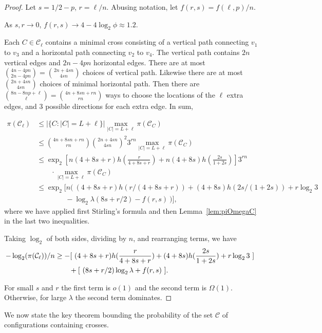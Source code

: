 \documentclass[letterpaper,english,numberwithinsect]{amsart}
\newcommand{\cC}{\mathcal{C}}
\begin{document}
\begin{proof}
Let $s = 1/2 - p$, $r = \ell/n$. Abusing notation, let $f(r, s) = f(\ell, p)/n$.

As $s, r \rightarrow 0$, $f(r, s) \rightarrow 4 - 4\log_2\phi \approx 1.2$.

Each $C \in \cC_{\ell}$ contains a minimal cross consisting of a vertical path connecting $v_1$ to $v_3$ and a horizontal path connecting $v_2$ to $v_4$. 
The vertical path contains $2n$ vertical edges and $2n-4pn$ horizontal edges. 
There are at most $\binom{4n-4pn}{2n-4pn} = \binom{2n+4sn}{4sn}$ choices of  vertical path.  
Likewise there are at most $\binom{2n+4sn}{4sn}$ choices of minimal horizontal path.  
Then there are $\binom{8n-8np+\ell}{\ell} = \binom{4n+8sn+rn}{rn}$ ways to choose the locations of the $\ell$ extra edges, and $3$ possible directions for each extra edge. In sum,

\begin{align*}
\pi(\cC_{\ell}) & \leq | \{C : |C| = L + \ell \}| \max_{|C| = L + \ell} \pi(\cC_C ) \\
      & \leq \binom{4n+8sn+rn}{rn} \binom{2n+4sn}{4sn}^2 3^{rn} 
      \max_{|C| = L + \ell} \pi(\cC_C ) \\
      & \leq \exp_2\left[n(4+8s+r)h\left(\frac{r}{4+8s+r}\right) + n(4+8s)h\left(\frac{2s}{1 + 2s}\right)\right] 3^{rn} \\
      &  \qquad \cdot \max_{|C| = L + \ell} \pi(\cC_C ) \\
      & \leq \exp_2[n(~ (4+8s+r)h(r/(4+8s+r)) + (4+8s)h(2s/(1 + 2s)) + r\log_2 3  \\
      & \qquad\qquad  - \log_2\lambda(8s + r/2) - f(r, s)~)] ,
\end{align*}
where we have applied first Stirling's formula and then Lemma~\ref{lem:piOmegaC} in the last two inequalities.

Taking $\log_2$ of both sides, dividing by $n$, and rearranging terms, we have
\begin{align*}
- \log_2(\pi(\cC_{\ell}))/n & \geq  
                -[~(4+8s+r)h(\frac{r}{4+8s+r}) + (4+8s)h(\frac{2s}{1+2s}) + r \log_2 3 ~] \cr
				     & \qquad + [~ (8s+ r/2) \log_2 \lambda + f(r, s) ~] .
\end{align*}

For small $s$ and $r$ the first term is $o(1)$ and the second term is $\Omega(1)$. Otherwise, for large $\lambda$ the second term dominates.
\end{proof}

We now state the key theorem bounding  the probability of the set $\cC$ of configurations containing crosses.
\end{document}
